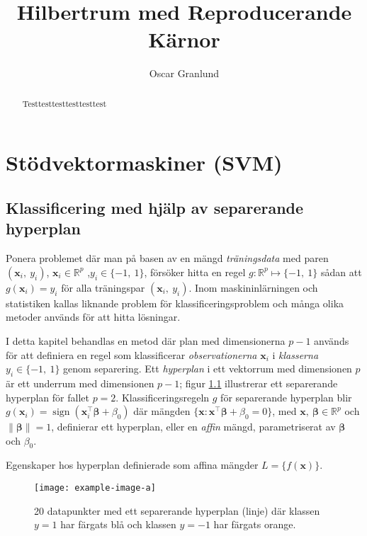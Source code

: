 \documentclass[a4paper, 12pt]{report}
\title{Hilbertrum med Reproducerande Kärnor}
\author{Oscar Granlund}
\DeclareMathOperator{\sign}{sign}
\begin{document}
\maketitle

\begin{abstract}
	Testtesttesttesttesttest
\end{abstract}

\chapter{Stödvektormaskiner (SVM)}

\section{Klassificering med hjälp av separerande hyperplan}
Ponera problemet där man på basen av en mängd \textit{träningsdata} med paren $(\mathbf{x}_i,~y_i)$, $\mathbf{x}_i\in\mathbb{R}^p$ ,$y_i\in \{-1,~1\}$, försöker hitta en regel $g: \mathbb{R}^p \longmapsto \{-1,~1\}$ sådan att $g(\mathbf{x}_i)=y_i$ för alla träningspar $(\mathbf{x}_i,~y_i)$. Inom maskininlärningen och statistiken kallas liknande problem för klassificeringsproblem och många olika metoder används för att hitta lösningar. 

I detta kapitel behandlas en metod där plan med dimensionerna $p-1$ används för att definiera en regel som klassificerar \textit{observationerna} $\mathbf{x}_i$ i \textit{klasserna} $y_i\in\{-1,~1\}$ genom separering. Ett \textit{hyperplan} i ett vektorrum med dimensionen $p$ är ett underrum med dimensionen $p-1$; figur \ref{fig:separatinghyperplane} illustrerar ett separerande hyperplan för fallet $p=2$. Klassificeringsregeln $g$ för separerande hyperplan blir $g(\mathbf{x}_i)=\sign (\mathbf{x}_i^\intercal\boldsymbol{\beta} + \beta_0)$ där mängden $\{\mathbf{x}: \mathbf{x}^\intercal \boldsymbol{\beta} + \beta_0=0\}$, med $\mathbf{x},~\boldsymbol{\beta}\in \mathbb{R}^p$ och $\|\boldsymbol{\beta}\|=1$, definierar ett hyperplan, eller en \textit{affin} mängd, parametriserat av $\boldsymbol\beta$ och $\beta_0$.\cite{ESL}

\begin{theorem}
	Egenskaper hos hyperplan definierade som affina mängder $L=\{f(\mathbf{x})\}$.
\end{theorem} 

\begin{figure}
\centering
\texttt{[image: example-image-a]}
\caption{\label{fig:separatinghyperplane}20 datapunkter med ett separerande hyperplan (linje) där klassen $y=1$ har färgats blå och klassen $y=-1$ har färgats orange.}
\end{figure}


\end{document}
